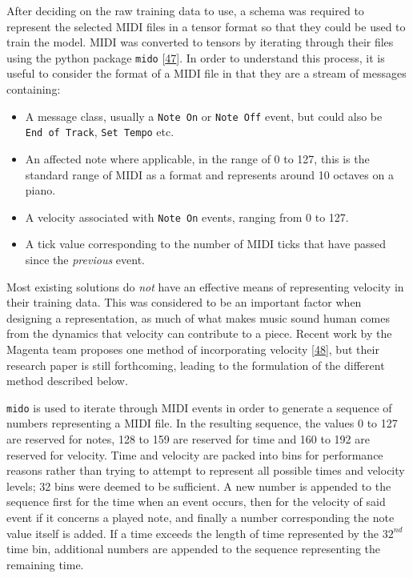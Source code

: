 \documentclass[12pt,]{article}
\providecommand{\tightlist}{%
  \setlength{\itemsep}{0pt}\setlength{\parskip}{0pt}}
\begin{document}
After deciding on the raw training data to use, a schema was required to
represent the selected MIDI files in a tensor format so that they could
be used to train the model. MIDI was converted to tensors by iterating
through their files using the python package \texttt{mido}
{[}\protect\hyperlink{ref-mido}{47}{]}. In order to understand this
process, it is useful to consider the format of a MIDI file in that they
are a stream of messages containing:

\begin{itemize}
\tightlist
\item
  A message class, usually a \texttt{Note\ On} or \texttt{Note\ Off}
  event, but could also be \texttt{End\ of\ Track}, \texttt{Set\ Tempo}
  etc.
\item
  An affected note where applicable, in the range of 0 to 127, this is
  the standard range of MIDI as a format and represents around 10
  octaves on a piano.
\item
  A velocity associated with \texttt{Note\ On} events, ranging from 0 to
  127.
\item
  A tick value corresponding to the number of MIDI ticks that have
  passed since the \emph{previous} event.
\end{itemize}

Most existing solutions do \emph{not} have an effective means of
representing velocity in their training data. This was considered to be
an important factor when designing a representation, as much of what
makes music sound human comes from the dynamics that velocity can
contribute to a piece. Recent work by the Magenta team proposes one
method of incorporating velocity
{[}\protect\hyperlink{ref-performance-rnn-2017}{48}{]}, but their
research paper is still forthcoming, leading to the formulation of the
different method described below.

\texttt{mido} is used to iterate through MIDI events in order to
generate a sequence of numbers representing a MIDI file. In the
resulting sequence, the values 0 to 127 are reserved for notes, 128 to
159 are reserved for time and 160 to 192 are reserved for velocity. Time
and velocity are packed into bins for performance reasons rather than
trying to attempt to represent all possible times and velocity levels;
32 bins were deemed to be sufficient. A new number is appended to the
sequence first for the time when an event occurs, then for the velocity
of said event if it concerns a played note, and finally a number
corresponding the note value itself is added. If a time exceeds the
length of time represented by the \(32^{nd}\) time bin, additional
numbers are appended to the sequence representing the remaining time.
\end{document}
